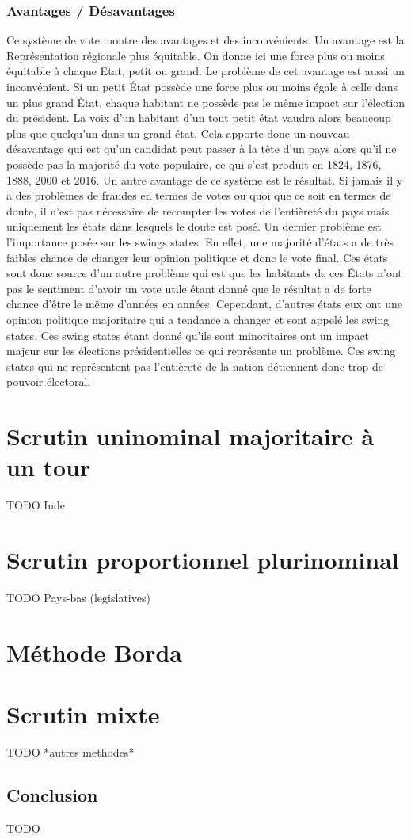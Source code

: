 \documentclass[11pt,a4paper]{report}
\begin{document}
\subsection{Avantages / Désavantages}
Ce système de vote montre des avantages et des inconvénients.
Un avantage est la Représentation régionale plus équitable.
On donne ici une force plus ou moins équitable à chaque Etat, petit ou grand.
Le problème de cet avantage est aussi un inconvénient.
Si un petit État possède une force plus ou moins égale à celle dans un plus grand État, chaque habitant ne possède pas le même impact sur l'élection du président.
La voix d’un habitant d’un tout petit état vaudra alors beaucoup plus que quelqu’un dans un grand état.
Cela apporte donc un nouveau désavantage qui est qu’un candidat peut passer à la tête d’un pays alors qu’il ne possède pas la majorité du vote populaire, ce qui s’est produit en 1824, 1876, 1888, 2000 et 2016.
Un autre avantage de ce système est le résultat.
Si jamais il y a des problèmes de fraudes en termes de votes ou quoi que ce soit en termes de doute, il n’est pas nécessaire de recompter les votes de l'entièreté du pays mais uniquement les états dans lesquels le doute est posé.
Un dernier problème est l’importance posée sur les swings states.
En effet, une majorité d’états a de très faibles chance de changer leur opinion politique et donc le vote final.
Ces états sont donc source d’un autre problème qui est que les habitants de ces États n’ont pas le sentiment d’avoir un vote utile étant donné que le résultat a de forte chance d’être le même d’années en années.
Cependant, d’autres états eux ont une opinion politique majoritaire qui a tendance a changer et sont appelé les swing states.
Ces swing states étant donné qu’ils sont minoritaires ont un impact majeur sur les élections présidentielles ce qui représente un problème.
Ces swing states qui ne représentent pas l'entièreté de la nation détiennent donc trop de pouvoir électoral.
\nocite{greelane:eleccoll}
\nocite{gov:fedpapers68}

\chapter{Scrutin uninominal majoritaire à un tour}
TODO Inde

\chapter{Scrutin proportionnel plurinominal}
TODO Pays-bas (legislatives)

\chapter{Méthode Borda}

\chapter{Scrutin mixte}

TODO *autres methodes*


\newpage
\section*{Conclusion}
TODO

 

\end{document}
